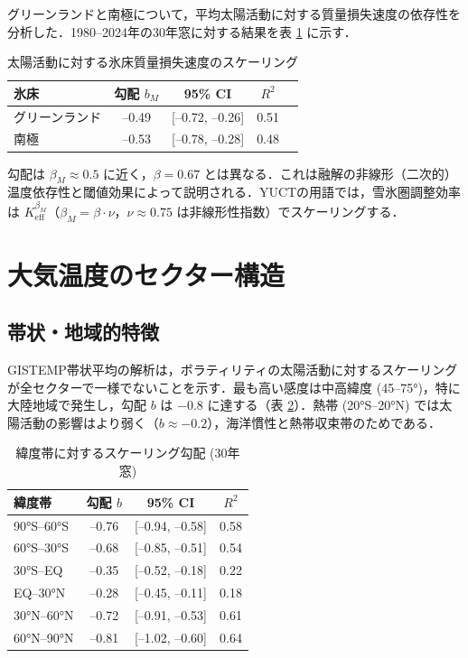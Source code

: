 \documentclass[11pt,a4paper]{article}
\newcommand{\Keff}{K_{\mathrm{eff}}}
\newcommand{\be}{\beta}
\begin{document}
	グリーンランドと南極について，平均太陽活動に対する質量損失速度の依存性を分析した．1980–2024年の30年窓に対する結果を表 \ref{tab:icescaling} に示す．
	
	\begin{table}[htbp]
		\centering
		\caption{太陽活動に対する氷床質量損失速度のスケーリング}
		\label{tab:icescaling}
		\begin{tabular}{@{}lcccc@{}}
			\toprule
			氷床 & 勾配 $b_M$ & 95\% CI & $R^2$ \\
			\midrule
			グリーンランド & –0.49 & [–0.72, –0.26] & 0.51 \\
			南極           & –0.53 & [–0.78, –0.28] & 0.48 \\
			\bottomrule
		\end{tabular}
	\end{table}
	
	勾配は $\beta_M \approx 0.5$ に近く，$\be = 0.67$ とは異なる．これは融解の非線形（二次的）温度依存性と閾値効果によって説明される．YUCTの用語では，雪氷圏調整効率は $\Keff^{\beta_M}$（$\beta_M = \be \cdot \nu$，$\nu \approx 0.75$ は非線形性指数）でスケーリングする．
	
	\section{大気温度のセクター構造}
	
	\subsection{帯状・地域的特徴}
	
	GISTEMP帯状平均の解析は，ボラティリティの太陽活動に対するスケーリングが全セクターで一様でないことを示す．最も高い感度は中高緯度 (45–75°)，特に大陸地域で発生し，勾配 $b$ は $-0.8$ に達する（表 \ref{tab:zonal}）．熱帯 (20°S–20°N) では太陽活動の影響はより弱く（$b \approx -0.2$），海洋慣性と熱帯収束帯のためである．
	
	\begin{table}[htbp]
		\centering
		\caption{緯度帯に対するスケーリング勾配 (30年窓)}
		\label{tab:zonal}
		\begin{tabular}{@{}lccc@{}}
			\toprule
			緯度帯 & 勾配 $b$ & 95\% CI & $R^2$ \\
			\midrule
			90°S–60°S & –0.76 & [–0.94, –0.58] & 0.58 \\
			60°S–30°S & –0.68 & [–0.85, –0.51] & 0.54 \\
			30°S–EQ   & –0.35 & [–0.52, –0.18] & 0.22 \\
			EQ–30°N   & –0.28 & [–0.45, –0.11] & 0.18 \\
			30°N–60°N & –0.72 & [–0.91, –0.53] & 0.61 \\
			60°N–90°N & –0.81 & [–1.02, –0.60] & 0.64 \\
			\bottomrule
		\end{tabular}
	\end{table}
	
\end{document}
